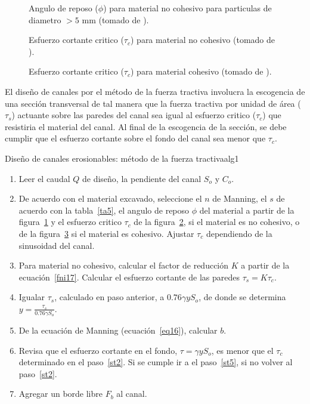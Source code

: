 \documentclass[11pt, oneside]{article}
\begin{document}
\begin{figure}[h!]
\centering
\caption{Angulo de reposo ($\phi$) para material no cohesivo  para particulas de diametro $> 5$ mm (tomado de \cite{Chau}).}
\label{fnor8}
\end{figure}

\begin{figure}[h!]
\centering
\caption{Esfuerzo cortante critico ($\tau_c$) para material no cohesivo (tomado de \cite{Chau}).}
\label{fnor9}
\end{figure}

\begin{figure}[h!]
\centering
\caption{Esfuerzo cortante critico ($\tau_c$) para material cohesivo (tomado de \cite{Chau}).}
\label{fnor10}
\end{figure}

El diseño de canales por el m\'etodo de la fuerza tractiva involucra la escogencia de una secci\'on transversal de tal manera que la fuerza tractiva por unidad de \'area ($\tau_s$) actuante sobre las paredes del canal sea igual al esfuerzo critico ($\tau_c$) que resistiria el material del canal. Al final de la escogencia de la secci\'on, se debe cumplir que el esfuerzo cortante sobre el fondo del canal sea menor que $\tau_c$.

\begin{alg}{Diseño de canales erosionables: m\'etodo de la fuerza tractiva}{alg1}
\begin{enumerate}
\item Leer el caudal $Q$ de diseño, la pendiente del canal $S_o$ y $C_o$.
\item \label{st2} De acuerdo con el material excavado, seleccione el $n$ de Manning, el $s$ de acuerdo con la tabla~\ref{ta5}, el angulo de reposo $\phi$ del material a partir de la figura~\ref{fnor8} y el esfuerzo critico $\tau_c$ de la figura~\ref{fnor9}, si el material es no cohesivo, o de la figura~\ref{fnor10} si el material es cohesivo. Ajustar $\tau_c$ dependiendo de la sinusoidad del canal. 
\item Para material no cohesivo, calcular el factor de reducci\'on $K$ a partir de la ecuaci\'on~\ref{fni17}. Calcular el esfuerzo cortante de las paredes $\tau_s = K \tau_c$.
\item Igualar $\tau_s$, calculado en paso anterior, a $0.76\gamma y S_o$, de donde se determina $y=\frac{\tau_s}{0.76 \gamma S_o}$. 
\item De la ecuaci\'on de Manning (ecuaci\'on~\ref{eq16}), calcular $b$.
\item Revisa que el esfuerzo cortante en el fondo, $\tau = \gamma y S_o$, es menor que el $\tau_c$ determinado en el paso~\ref{st2}. Si se cumple ir a el paso~\ref{st5}, si no volver al paso~\ref{st2}. 
\item \label{st5} Agregar un borde libre $F_b$ al canal.
\end{enumerate}
\end{alg}
\end{document}
